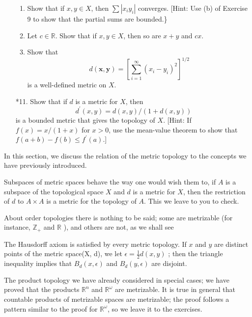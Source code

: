 \begin{enumerate}[itemsep=0.4em, parsep=0pt, topsep=0pt, partopsep=0pt, leftmargin=*, label=\arabic*., ref=\arabic*]
  \begin{enumerate}[itemsep=0.2em, parsep=0pt, topsep=0pt, partopsep=0pt, leftmargin=*, label=(\alph*), align=left]
  \item Show that if \(x,y \in X\), then \(\sum | {x_{i}y_{i}}|\) converges. [Hint: Use (b) of Exercise 9 to show that the partial sums are bounded.\}
  \item Let \(c \in \mathbb{R}\). Show that if \(x,y \in X\), then so are \(x + y\) and \({cx}\).
  \item Show that \[ d( {\mathbf{x},\mathbf{y}}) = {[ \mathop{\sum }\limits_{{i = 1}}^{\infty }{( x_{i} - y_{i}) }^{2}] }^{1/2} \] is a well-defined metric on \(X\).
  \end{enumerate}
\item[*11.] Show that if \(d\) is a metric for \(X\), then \[ d^{\prime }( {x,y}) = d( {x,y}) /( {1 + d( {x,y}) }) \] is a bounded metric that gives the topology of \(X\). [Hint: If \(f(x) = x/( {1 + x})\) for \(x > 0\), use the mean-value theorem to show that \(f( {a + b}) - f( b) \leq {f}^{\prime }( a)\).]
\end{enumerate}


In this section, we discuss the relation of the metric topology to the concepts we have previously introduced.

Subspaces of metric spaces behave the way one would wish them to, if \(A\) is a subspace of the topological space \(X\) and \(d\) is a metric for \(X\), then the restriction of \(d\) to \(A \times A\) is a metric for the topology of \(A\). This we leave to you to check.

About order topologies there is nothing to be said; some are metrizable (for instance, \(\mathbb{Z}_{ + }\) and \(\mathbb{R}\) ), and others are not, as we shall see

The Hausdorff axiom is satisfied by every metric topology. If \(x\) and \(y\) are distinct points of the metric space(X, d), we let \(\epsilon = \frac{1}{2}d( {x,y})\) ; then the triangle inequality implies that \(B_{d}( {x,\epsilon })\) and \(B_{d}( {y,\epsilon })\) are disjoint.

The product topology we have already considered in special cases; we have proved that the products \(\mathbb{R}^{n}\) and \(\mathbb{R}^{\omega }\) are metrizable. It is true in general that countable products of metrizable spaces are metrizable; the proof follows a pattern similar to the proof for \(\mathbb{R}^{\omega }\), so we leave it to the exercises.


